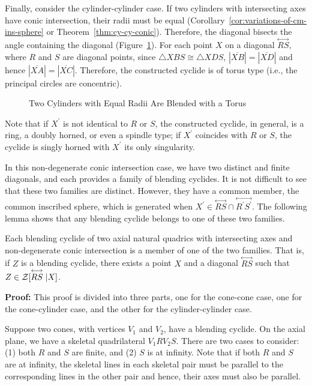      Finally, consider the cylinder-cylinder case.  If two cylinders with 
intersecting axes have conic intersection, their radii must be equal
(Corollary~\ref{cor:variations-of-cm-ins-sphere} or
Theorem~\ref{thm:cy-cy-conic}).  Therefore, the diagonal bisects the angle
containing the diagonal (Figure~\ref{fig:construct-torus}).  
For each point $X$ on a diagonal
$\stackrel{\longleftrightarrow}{RS}$, where $R$ and $S$ are diagonal points,
since $\bigtriangleup XBS\cong\bigtriangleup XDS$,
$|\overline{XB}|=|\overline{XD}|$ and hence $|\overline{XA}|=|\overline{XC}|$.
Therefore, the constructed cyclide is of torus type (i.e., the principal 
circles are concentric).  \QED
\begin{figure}
\vspace{4.5cm}
\caption{Two Cylinders with Equal Radii Are Blended with a Torus}
\label{fig:construct-torus}
\end{figure}

     Note that if $X^\prime$ is not identical to $R$ or $S$, the constructed
cyclide, in general, is a ring, a doubly horned, or even a spindle type;
if $X^\prime$ coincides with $R$ or $S$, the cyclide is singly horned
with $X^\prime$ its only singularity.

     In this non-degenerate conic intersection case, we have two distinct and 
finite diagonals, and each provides a family of blending cyclides.  It is not 
difficult to see that these  two families are distinct.  However, they have a 
common member, the common inscribed sphere, which is generated when 
$X^\prime\in\stackrel{\longleftrightarrow}{RS}\cap
\stackrel{\longleftrightarrow}{R^\prime S^\prime}$.
The following lemma shows that any blending 
cyclide belongs to one of these two families.

\begin{lemma}
\label{lemma:two-families}
     Each blending cyclide of two axial natural quadrics with intersecting
axes and non-degenerate conic intersection is a member of one of the two 
families.  That is, if $Z$ is a blending cyclide, there exists a point $X$ 
and a diagonal $\stackrel{\longleftrightarrow}{RS}$ such that
$Z\in{\cal Z}[\stackrel{\longleftrightarrow}{RS}|X]$.
\end{lemma}
{\bf Proof:} This proof is divided into three parts, one for the cone-cone 
case, one for the cone-cylinder case, and the other for the cylinder-cylinder
case.

     Suppose two cones, with vertices $V_1$ and $V_2$, have a blending
cyclide.  On the axial plane, we have a skeletal quadrilateral $V_1RV_2S$.
There are two cases to consider: (1) both $R$ and $S$ are finite, and 
(2) $S$ is at infinity.  Note that if both $R$ and $S$ are at infinity, the 
skeletal lines in each skeletal pair must be parallel to the corresponding 
lines in the other pair and hence, their axes must also be parallel.

